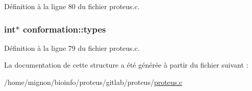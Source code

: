 Définition à la ligne 80 du fichier proteus.\+c.

\hypertarget{structconformation_a8e95e9777f616fffa55446ec61fbb589}{
\subsubsection[{types}]{\setlength{\rightskip}{0pt plus 5cm}int$\ast$ conformation\+::types}}\label{structconformation_a8e95e9777f616fffa55446ec61fbb589}


Définition à la ligne 79 du fichier proteus.\+c.



La documentation de cette structure a été générée à partir du fichier suivant \+:\begin{DoxyCompactItemize}
\item 
/home/mignon/bioinfo/proteus/gitlab/proteus/\hyperlink{proteus_8c}{proteus.\+c}\end{DoxyCompactItemize}
